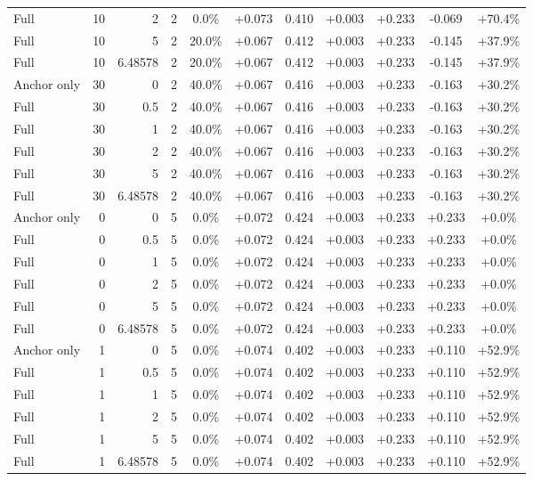 \begin{table}[htbp]
\begin{tabular}{lrrrccccccc}
Full & 10 & 2 & 2 & 0.0\% & +0.073 & 0.410 & +0.003 & +0.233 & -0.069 & +70.4\% \\
Full & 10 & 5 & 2 & 20.0\% & +0.067 & 0.412 & +0.003 & +0.233 & -0.145 & +37.9\% \\
Full & 10 & 6.48578 & 2 & 20.0\% & +0.067 & 0.412 & +0.003 & +0.233 & -0.145 & +37.9\% \\
Anchor only & 30 & 0 & 2 & 40.0\% & +0.067 & 0.416 & +0.003 & +0.233 & -0.163 & +30.2\% \\
Full & 30 & 0.5 & 2 & 40.0\% & +0.067 & 0.416 & +0.003 & +0.233 & -0.163 & +30.2\% \\
Full & 30 & 1 & 2 & 40.0\% & +0.067 & 0.416 & +0.003 & +0.233 & -0.163 & +30.2\% \\
Full & 30 & 2 & 2 & 40.0\% & +0.067 & 0.416 & +0.003 & +0.233 & -0.163 & +30.2\% \\
Full & 30 & 5 & 2 & 40.0\% & +0.067 & 0.416 & +0.003 & +0.233 & -0.163 & +30.2\% \\
Full & 30 & 6.48578 & 2 & 40.0\% & +0.067 & 0.416 & +0.003 & +0.233 & -0.163 & +30.2\% \\
Anchor only & 0 & 0 & 5 & 0.0\% & +0.072 & 0.424 & +0.003 & +0.233 & +0.233 & +0.0\% \\
Full & 0 & 0.5 & 5 & 0.0\% & +0.072 & 0.424 & +0.003 & +0.233 & +0.233 & +0.0\% \\
Full & 0 & 1 & 5 & 0.0\% & +0.072 & 0.424 & +0.003 & +0.233 & +0.233 & +0.0\% \\
Full & 0 & 2 & 5 & 0.0\% & +0.072 & 0.424 & +0.003 & +0.233 & +0.233 & +0.0\% \\
Full & 0 & 5 & 5 & 0.0\% & +0.072 & 0.424 & +0.003 & +0.233 & +0.233 & +0.0\% \\
Full & 0 & 6.48578 & 5 & 0.0\% & +0.072 & 0.424 & +0.003 & +0.233 & +0.233 & +0.0\% \\
Anchor only & 1 & 0 & 5 & 0.0\% & +0.074 & 0.402 & +0.003 & +0.233 & +0.110 & +52.9\% \\
Full & 1 & 0.5 & 5 & 0.0\% & +0.074 & 0.402 & +0.003 & +0.233 & +0.110 & +52.9\% \\
Full & 1 & 1 & 5 & 0.0\% & +0.074 & 0.402 & +0.003 & +0.233 & +0.110 & +52.9\% \\
Full & 1 & 2 & 5 & 0.0\% & +0.074 & 0.402 & +0.003 & +0.233 & +0.110 & +52.9\% \\
Full & 1 & 5 & 5 & 0.0\% & +0.074 & 0.402 & +0.003 & +0.233 & +0.110 & +52.9\% \\
Full & 1 & 6.48578 & 5 & 0.0\% & +0.074 & 0.402 & +0.003 & +0.233 & +0.110 & +52.9\% \\

\end{tabular}
\end{table}
